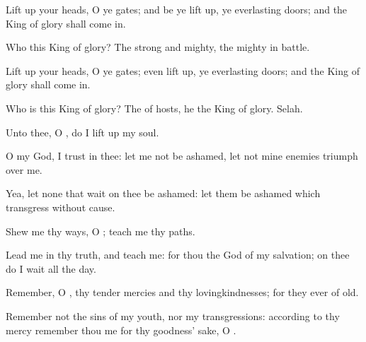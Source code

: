{\Q {}Lift
up your
heads, O ye
gates; and be ye lift
up, ye
everlasting
doors; and the
King of
glory shall come
in.


\par }{\Q {}Who
{} this
King of
glory? The
{}
strong and
mighty, the
{}
mighty in
battle.


\par }{\Q {}Lift
up your
heads, O ye
gates; even lift
{}
up, ye
everlasting
doors; and the
King of
glory shall come
in.


\par }{\Q {}Who is this
King of
glory? The
{} of
hosts, he
{} the
King of
glory.
Selah.




\par }
{\Q {}Unto thee, O
{}, do I lift
up my
soul.


\par }{\Q {}O my
God, I
trust in thee: let me not be
ashamed, let not mine
enemies
triumph over me.


\par }{\Q {}Yea, let none that
wait on thee be
ashamed: let them be
ashamed which
transgress without
cause.


\par }{\Q {}Shew me thy
ways, O
{};
teach me thy
paths.


\par }{\Q {}Lead me in thy
truth, and
teach me: for thou
{} the
God of my
salvation; on thee do I
wait all the
day.


\par }{\Q {}Remember, O
{}, thy tender
mercies and thy
lovingkindnesses; for they
{} ever of
old.


\par }{\Q {}Remember not the
sins of my
youth, nor my
transgressions: according to thy
mercy
remember thou me for thy
goodness’ sake, O
{}.


\par }{\BB \par }
